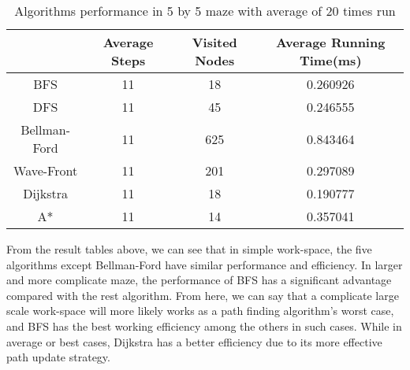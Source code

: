 \documentclass[11pt, onecolumn, letterpaper]{article}
\begin{document}
\begin{table}[htbp]
\begin{center}
\begin{tabular}{|c| c c c|}
\hline
 & Average Steps & Visited Nodes & Average Running Time(ms)\\
\hline
BFS & 11 & 18 & 0.260926\\
DFS & 11 & 45 & 0.246555\\
Bellman-Ford & 11 & 625 & 0.843464\\
Wave-Front & 11 & 201 & 0.297089\\
Dijkstra & 11 & 18 & 0.190777\\
A* & 11 & 14 & 0.357041\\
\hline
\end{tabular}
\end{center}
\caption{Algorithms performance in 5 by 5 maze with average of 20 times run}
\end{table}

From the result tables above, we can see that in simple work-space, the five algorithms except Bellman-Ford have similar performance and efficiency. In larger and more complicate maze, the performance of BFS has a significant advantage compared with the rest algorithm. From here, we can say that a complicate large scale work-space will more likely works as a path finding algorithm's worst case, and BFS has the best working efficiency among the others in such cases. While in average or best cases, Dijkstra has a better efficiency due to its more effective path update strategy.
\end{document}
